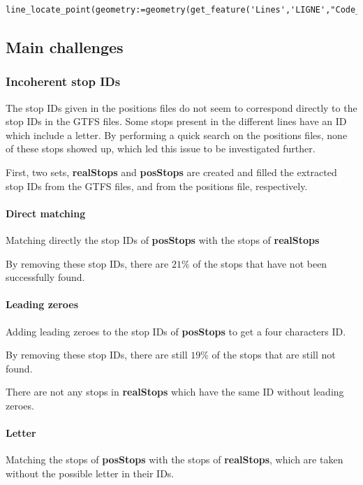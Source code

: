 \documentclass{article}
\begin{document}
\begin{lstlisting}
line_locate_point(geometry:=geometry(get_feature('Lines','LIGNE',"Code_Ligne")),point:=$geometry)
\end{lstlisting}

\subsection{Main challenges}

\subsubsection{Incoherent stop IDs} 
The stop IDs given in the positions files do not seem to correspond directly to the stop IDs in the GTFS files. Some stops present in the different lines have an ID which include a letter. By performing a quick search on the positions files, none of these stops showed up, which led this issue to be investigated further.

First, two sets, \textbf{realStops} and \textbf{posStops} are created and filled the extracted stop IDs from the GTFS files, and from the positions file, respectively.

\paragraph{Direct matching} Matching directly the stop IDs of \textbf{posStops} with the stops of \textbf{realStops}

By removing these stop IDs, there are $21\%$ of the stops that have not been successfully found.

\paragraph{Leading zeroes} Adding leading zeroes to the stop IDs of \textbf{posStops} to get a four characters ID.

By removing these stop IDs, there are still $19\%$ of the stops that are still not found.

There are not any stops in \textbf{realStops} which have the same ID without leading zeroes.

\paragraph{Letter} Matching the stops of \textbf{posStops} with the stops of \textbf{realStops}, which are taken without the possible letter in their IDs.
\end{document}

